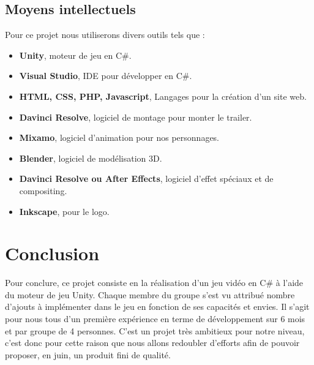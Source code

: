 \documentclass[12pt]{article}
\begin{document}
        \subsection{Moyens intellectuels}
         Pour ce projet nous utiliserons divers outils tels que :
         
            \begin{itemize}
                \setlength{\itemindent}{2em}
                \item \textbf{Unity}, moteur de jeu en C\#.
                \item \textbf{Visual Studio}, IDE pour développer en C\#.
                \item \textbf{HTML, CSS, PHP, Javascript}, Langages pour la création d'un site web.
                \item \textbf{Davinci Resolve}, logiciel de montage pour monter le trailer.
                \item \textbf{Mixamo}, logiciel d'animation pour nos personnages.
                \item \textbf{Blender}, logiciel de modélisation 3D.
                \item \textbf{Davinci Resolve ou After Effects}, logiciel d'effet spéciaux et de compositing.
                \item \textbf{Inkscape}, pour le logo.
            \end{itemize}
        
    \section{Conclusion}
        Pour conclure, ce projet consiste en la réalisation d'un jeu vidéo en C\# à l'aide du moteur de jeu Unity. Chaque membre du groupe s'est vu attribué nombre d'ajouts à implémenter dans le jeu en fonction de ses capacités et envies. Il s'agit pour nous tous d'un première expérience en terme de développement sur 6 mois et par groupe de 4 personnes. C'est un projet très ambitieux pour notre niveau, c'est donc pour cette raison que nous allons redoubler d'efforts afin de pouvoir proposer, en juin, un produit fini de qualité.
    
\end{document}
